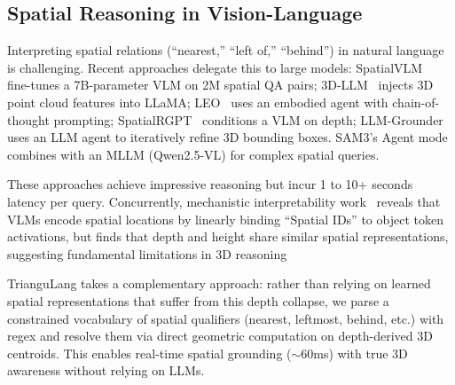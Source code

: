

\subsection{Spatial Reasoning in Vision-Language}
Interpreting spatial relations (``nearest,'' ``left of,'' ``behind'') in natural language is challenging. Recent approaches delegate this to large models: SpatialVLM~\cite{spatialvlm} fine-tunes a 7B-parameter VLM on 2M spatial QA pairs; 3D-LLM~\cite{3dllm} injects 3D point cloud features into LLaMA; LEO~\cite{leo} uses an embodied agent with chain-of-thought prompting; SpatialRGPT~\cite{spatialrgpt} conditions a VLM on depth; LLM-Grounder~\cite{llm-grounder} uses an LLM agent to iteratively refine 3D bounding boxes. SAM3's Agent mode~\cite{sam3} combines with an MLLM (Qwen2.5-VL) for complex spatial queries.

These approaches achieve impressive reasoning but incur 1 to 10+ seconds latency per query. Concurrently, mechanistic interpretability work~\cite{spatialids2026} reveals that VLMs encode spatial locations by linearly binding ``Spatial IDs'' to object token activations, but finds that depth and height share similar spatial representations, suggesting fundamental limitations in 3D reasoning

TrianguLang takes a complementary approach: rather than relying on learned spatial representations that suffer from this depth collapse, we parse a constrained vocabulary of spatial qualifiers (nearest, leftmost, behind, etc.) with regex and resolve them via direct geometric computation on depth-derived 3D centroids. This enables real-time spatial grounding ($\sim$60ms) with true 3D awareness without relying on LLMs.




